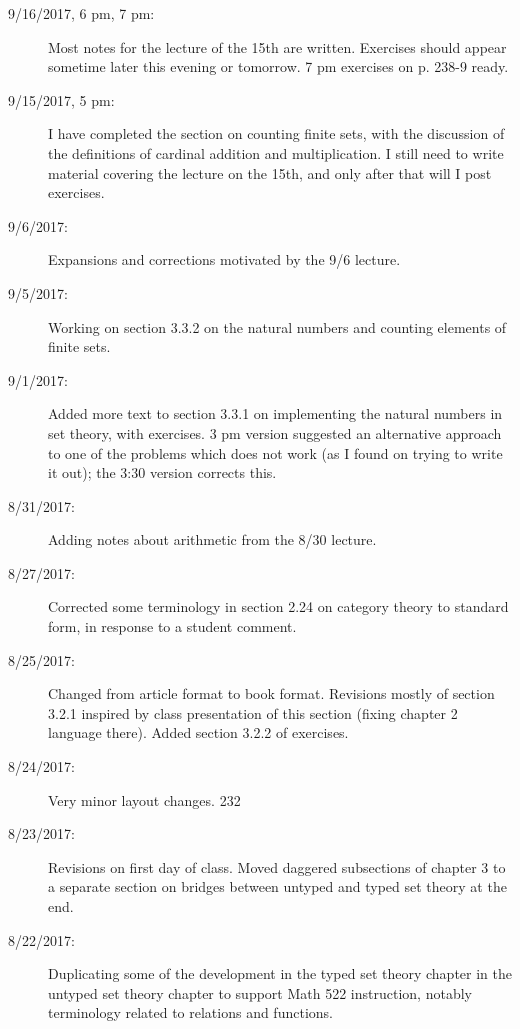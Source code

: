 \documentclass[12pt]{book}
\begin{document}
{\begin{description}
\item[9/16/2017, 6 pm, 7 pm:]  Most notes for the lecture of the 15th are written.  Exercises should appear sometime later this evening or tomorrow.  7 pm exercises on p. 238-9 ready.

\item[9/15/2017, 5 pm:]  I have completed the section on counting finite sets, with the discussion of the definitions of cardinal addition and multiplication.  I still need to write material covering the lecture on the 15th, and only after that will I post exercises.

\item[9/6/2017:]  Expansions and corrections motivated by the 9/6 lecture.

\item[9/5/2017:]  Working on section 3.3.2 on the natural numbers and counting elements of finite sets.

\item[9/1/2017:]  Added more text to section 3.3.1 on implementing the natural numbers in set theory, with exercises.  3 pm version suggested an alternative approach to one of the problems which does not work (as I found on trying to write it out);  the 3:30 version corrects this.

\item[8/31/2017:]  Adding notes about arithmetic from the 8/30 lecture.

\item[8/27/2017:]  Corrected some terminology in section 2.24 on category theory to standard form, in response to a student comment.

\item[8/25/2017:]  Changed from article format to book format.  Revisions mostly of section 3.2.1 inspired by class presentation of this section (fixing chapter 2 language there).  Added section 3.2.2 of exercises.

\item[8/24/2017:]  Very minor layout changes.
232
\item[8/23/2017:]  Revisions on first day of class.  Moved daggered subsections of chapter 3 to a separate section on bridges between untyped and typed set theory at the end.

\item[8/22/2017:]  Duplicating some of the development in the typed set theory chapter in the untyped set theory chapter to support Math 522 instruction, notably terminology related to relations and functions.


\end{description}}
\end{document}

